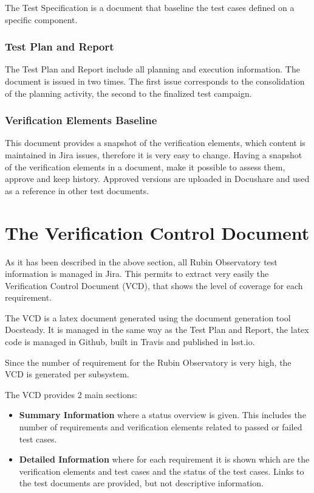 The Test Specification is a document that baseline the test cases defined on a specific component.


\subsubsection{Test Plan and Report}

The Test Plan and Report include all planning and execution information. 
The document  is issued in two times. The first issue corresponds to the consolidation of the planning activity, 
the second to the finalized test campaign.


\subsubsection{Verification Elements Baseline}

This document provides a snapshot of the verification elements, which content is maintained in Jira issues, therefore it is very easy to change.
Having a snapshot of the verification elements in a document, make it possible to assess them, approve and keep history.
Approved versions are uploaded in Docushare and used as a reference in other test documents.


\section{The Verification Control Document}

As it has been described in the above section, all Rubin Observatory test information is managed in Jira. 
This permits to extract very easily the Verification Control Document (VCD), that shows the level of coverage for each requirement.

The VCD is a latex document generated using the document generation tool Docsteady. 
It is managed in the same way as the Test Plan and Report, the latex code is managed in Github,
built in Travis and published in lsst.io.

Since the number of requirement for the Rubin Observatory is very high, the VCD is generated per subsystem.

The VCD provides 2 main sections:

\begin{itemize}
\item \textbf{Summary Information} where a status overview is given. 
This includes the number of requirements and verification elements related to passed or failed test cases.
\item \textbf{Detailed Information} where for each requirement it is shown which are the verification elements and test cases
and the status of the test cases. Links to the test documents are provided, but not descriptive information.
\end{itemize}

